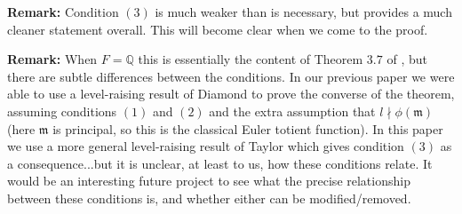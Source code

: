 \documentclass[a4paper,oneside]{amsart}
\theoremstyle{plain}
\theoremstyle{definition}
\begin{document}
\vspace{0.1in}
\noindent \textbf{Remark:} Condition $(3)$ is much weaker than is necessary, but provides a much cleaner statement overall. This will become clear when we come to the proof.

\vspace{0.1in}
\noindent \textbf{Remark:} When $F=\mathbb{Q}$ this is essentially the content of Theorem $3.7$ of \cite{fretwellroberts}, but there are subtle differences between the conditions. In our previous paper we were able to use a level-raising result of Diamond to prove the converse of the theorem, assuming conditions $(1)$ and $(2)$ and the extra assumption that $l\nmid \phi(\mathfrak{m})$ (here $\mathfrak{m}$ is principal, so this is the classical Euler totient function). In this paper we use a more general level-raising result of Taylor which gives condition $(3)$ as a consequence...but it is unclear, at least to us, how these conditions relate. It would be an interesting future project to see what the precise relationship between these conditions is, and whether either can be modified/removed.
\end{document}
